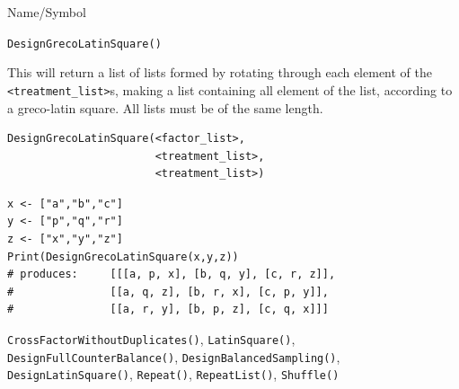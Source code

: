 \begin{desc}{Name/Symbol}
\item[Name/Symbol]	\verb+DesignGrecoLatinSquare()+

\item[Description] This will return a list of lists formed by rotating
  through each element of the \verb+<treatment_list>+s, making a list
  containing all element of the list, according to a greco-latin
  square.  All lists must be of the same length.

\item[Usage]
\begin{verbatim}
DesignGrecoLatinSquare(<factor_list>, 
                       <treatment_list>, 
                       <treatment_list>)
\end{verbatim}

\item[Example]
\begin{verbatim}
x <- ["a","b","c"]
y <- ["p","q","r"]
z <- ["x","y","z"]
Print(DesignGrecoLatinSquare(x,y,z))
# produces:   	[[[a, p, x], [b, q, y], [c, r, z]], 
#               [[a, q, z], [b, r, x], [c, p, y]], 
#               [[a, r, y], [b, p, z], [c, q, x]]]
\end{verbatim}

\item[See Also] \verb+CrossFactorWithoutDuplicates()+, \verb+LatinSquare()+,\\
  \verb+DesignFullCounterBalance()+, \verb+DesignBalancedSampling()+,\\
  \verb+DesignLatinSquare()+, \verb+Repeat()+, \verb+RepeatList()+,
  \verb+Shuffle()+
\end{desc}




